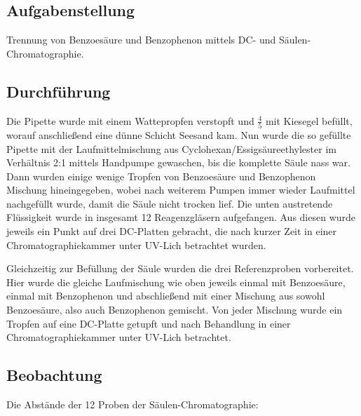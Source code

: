 \documentclass[10pt]{scrartcl}
\begin{document}
\subsection{Aufgabenstellung}
Trennung von Benzoesäure und Benzophenon mittels DC- und Säulen-Chromatographie.
\subsection{Durchführung}
Die Pipette wurde mit einem Wattepropfen verstopft und $\frac{4}{5}$ mit Kiesegel befüllt, worauf anschließend eine dünne Schicht Seesand kam. 
Nun wurde die so gefüllte Pipette mit der Laufmittelmischung aus Cyclohexan/Essigsäureethylester im Verhältnis 2:1 mittels Handpumpe gewaschen, bis die komplette Säule nass war. Dann wurden einige wenige Tropfen von Benzoesäure und Benzophenon Mischung hineingegeben, wobei nach weiterem Pumpen immer wieder Laufmittel nachgefüllt wurde, damit die Säule nicht trocken lief. Die unten austretende Flüssigkeit wurde in insgesamt 12 Reagenzgläsern aufgefangen. Aus diesen wurde jeweils ein Punkt auf drei DC-Platten gebracht, die nach kurzer Zeit in einer Chromatographiekammer unter UV-Lich betrachtet wurden.

Gleichzeitig zur Befüllung der Säule wurden die drei Referenzproben vorbereitet. Hier wurde die gleiche Laufmischung wie oben jeweils einmal mit Benzoesäure, einmal mit Benzophenon und abschließend mit einer Mischung aus sowohl Benzoesäure, also auch Benzophenon gemischt. Von jeder Mischung wurde ein Tropfen auf eine DC-Platte getupft und nach Behandlung in einer Chromatographiekammer unter UV-Lich betrachtet. 
\newpage
\subsection{Beobachtung}
Die Abstände der 12 Proben der Säulen-Chromatographie:
\end{document}
